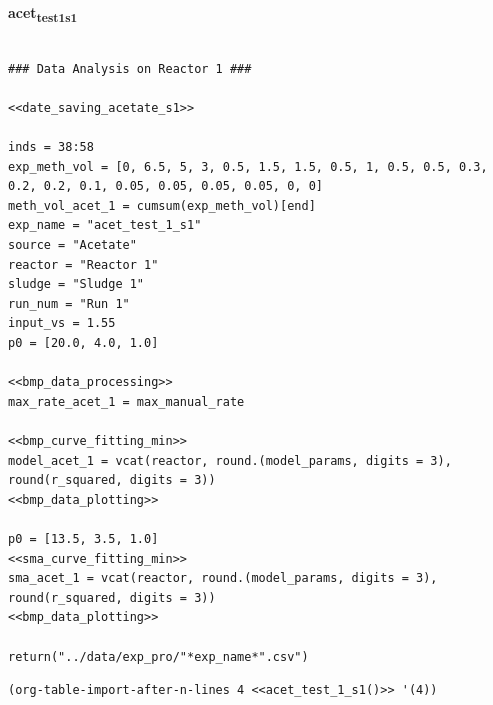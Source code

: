 \documentclass[11pt]{article}
\begin{document}
\textbf{acet\textsubscript{test}\textsubscript{1}\textsubscript{s1}}
\begin{verbatim}

### Data Analysis on Reactor 1 ###

<<date_saving_acetate_s1>>

inds = 38:58
exp_meth_vol = [0, 6.5, 5, 3, 0.5, 1.5, 1.5, 0.5, 1, 0.5, 0.5, 0.3, 0.2, 0.2, 0.1, 0.05, 0.05, 0.05, 0.05, 0, 0]
meth_vol_acet_1 = cumsum(exp_meth_vol)[end]
exp_name = "acet_test_1_s1"
source = "Acetate"
reactor = "Reactor 1"
sludge = "Sludge 1"
run_num = "Run 1"
input_vs = 1.55
p0 = [20.0, 4.0, 1.0]

<<bmp_data_processing>>
max_rate_acet_1 = max_manual_rate

<<bmp_curve_fitting_min>>
model_acet_1 = vcat(reactor, round.(model_params, digits = 3), round(r_squared, digits = 3))
<<bmp_data_plotting>>

p0 = [13.5, 3.5, 1.0]
<<sma_curve_fitting_min>>
sma_acet_1 = vcat(reactor, round.(model_params, digits = 3), round(r_squared, digits = 3))
<<bmp_data_plotting>>

return("../data/exp_pro/"*exp_name*".csv")
\end{verbatim}

\begin{verbatim}
(org-table-import-after-n-lines 4 <<acet_test_1_s1()>> '(4))
\end{verbatim}
\end{document}
